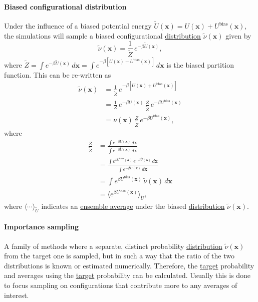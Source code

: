 \documentclass[9pt,review]{livecoms}
\newcommand{\vx}{\mathbf{x}}
\begin{document}
\hypertarget{ref:BiasedDist} {\paragraph{Biased configurational distribution}}
Under the influence of a biased potential energy $\tilde{U}(\vx) =  U(\vx) + U^\mathrm{bias}(\vx)$, the simulations will sample a biased configurational \hyperlink{ref:Distribution} {distribution} $\tilde{\nu}(\vx)$ given by
\begin{equation}
\label{eq:biased_configurational distribution}
\tilde{\nu}(\vx) = \frac{1}{\tilde{Z}} \, e^{-\beta \tilde{U}(\vx)},
\end{equation}
where $\tilde{Z} = \int e^{-\beta \tilde{U}(\vx)} \, d\vx = \int e^{-\beta\left [ U(\vx) + U^\mathrm{bias}(\vx) \right]} \, d\vx$ is the biased partition function.
This can be re-written as
\begin{align}
\label{eq:biased_x_distribtion_rewritten}
\tilde{\nu}(\vx) & =
\frac{1}{\tilde{Z}} \, e^{-\beta\left [ U(\vx) + U^\mathrm{bias}(\vx) \right]}
\nonumber \\
& =
\frac{1}{Z} \, e^{-\beta U(\vx)} \, \frac{Z}{\tilde{Z}} \, e^{-\beta U^\mathrm{bias}(\vx)}
\nonumber \\
& =
\nu(\vx) \, \frac{Z}{\tilde{Z}} \, e^{-\beta U^\mathrm{bias}(\vx)},
\end{align}
where
\begin{align}
\label{eq:fraction_of_partition_functions}
\frac{Z}{\tilde{Z}} & =
\frac{\int e^{-\beta U(\vx)} \, d\vx} {\int e^{-\beta \tilde{U}(\vx)} \, d\vx}
\nonumber \\
& =
\frac{\int  e^{\beta U^\mathrm{bias}(\vx)} \, e^{-\beta \tilde{U}(\vx)} \, d\vx} {\int e^{-\beta \tilde{U}(\vx)} \, d\vx}
\nonumber \\
& =
\int  e^{\beta U^\mathrm{bias}(\vx)} \, \tilde{\nu}(\vx) \, d\vx
\nonumber \\
& =
\langle e^{\beta U^\mathrm{bias}(\vx)} \rangle_{\tilde U},
\end{align}
where $\langle \cdots \rangle_{\tilde U}$ indicates an \hyperlink{ref:ensemble_average} {ensemble average} under the biased \hyperlink{ref:Distribution} {distribution} $\tilde{\nu}(\vx)$.


\hypertarget{ref:IS} {\paragraph{Importance sampling}}
\label{sec:importance_sampling} A family of methods where a separate, distinct probability \hyperlink{ref:Distribution} {distribution} $\tilde\nu(\vx)$ from the target one is sampled, but in such a way that the ratio of the two distributions is known or estimated numerically. Therefore, the \hyperlink{ref:targetdist} {target} probability and averages using the \hyperlink{ref:targetdist} {target} probability can be calculated.  Usually this is done to focus sampling on configurations that contribute more to any averages of interest.
\end{document}
